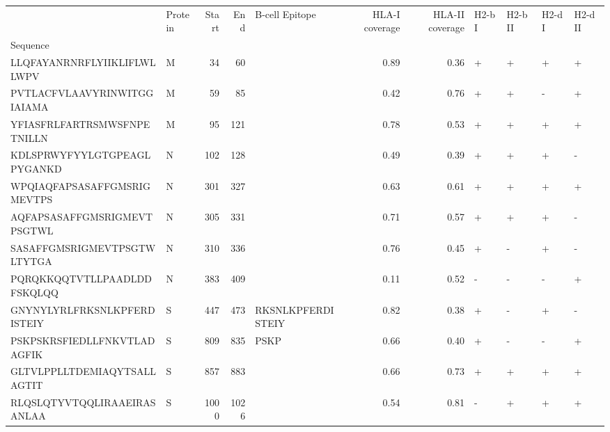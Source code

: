 \begin{tabular}{llrrlrrllll}
\toprule
{} & Protein &  Start &   End &     B-cell Epitope &  HLA-I coverage &  HLA-II coverage & H2-b I & H2-b II & H2-d I & H2-d II \\
Sequence                    &         &        &       &                    &                 &                  &        &         &        &         \\
\midrule
LLQFAYANRNRFLYIIKLIFLWLLWPV &       M &     34 &    60 &                    &            0.89 &             0.36 &      + &       + &      + &       + \\
PVTLACFVLAAVYRINWITGGIAIAMA &       M &     59 &    85 &                    &            0.42 &             0.76 &      + &       + &      - &       + \\
YFIASFRLFARTRSMWSFNPETNILLN &       M &     95 &   121 &                    &            0.78 &             0.53 &      + &       + &      + &       + \\
KDLSPRWYFYYLGTGPEAGLPYGANKD &       N &    102 &   128 &                    &            0.49 &             0.39 &      + &       + &      + &       - \\
WPQIAQFAPSASAFFGMSRIGMEVTPS &       N &    301 &   327 &                    &            0.63 &             0.61 &      + &       + &      + &       + \\
AQFAPSASAFFGMSRIGMEVTPSGTWL &       N &    305 &   331 &                    &            0.71 &             0.57 &      + &       + &      + &       - \\
SASAFFGMSRIGMEVTPSGTWLTYTGA &       N &    310 &   336 &                    &            0.76 &             0.45 &      + &       - &      + &       - \\
PQRQKKQQTVTLLPAADLDDFSKQLQQ &       N &    383 &   409 &                    &            0.11 &             0.52 &      - &       - &      - &       + \\
GNYNYLYRLFRKSNLKPFERDISTEIY &       S &    447 &   473 &  RKSNLKPFERDISTEIY &            0.82 &             0.38 &      + &       - &      + &       - \\
PSKPSKRSFIEDLLFNKVTLADAGFIK &       S &    809 &   835 &               PSKP &            0.66 &             0.40 &      + &       - &      - &       + \\
GLTVLPPLLTDEMIAQYTSALLAGTIT &       S &    857 &   883 &                    &            0.66 &             0.73 &      + &       + &      + &       + \\
RLQSLQTYVTQQLIRAAEIRASANLAA &       S &   1000 &  1026 &                    &            0.54 &             0.81 &      - &       + &      + &       + \\

\end{tabular}
